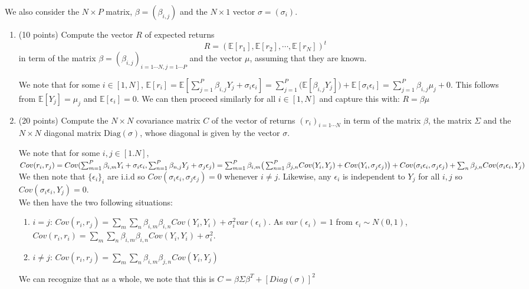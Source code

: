 \documentclass[12pt,twoside, letter]{exam}
\theoremstyle{definition}
\newcommand{\ee}{\mathbb{E}}
\begin{document}
We also consider the  $N\times P$ matrix, $\beta=(\beta_{i,j})$ and the $N\times 1$ vector $\sigma=(\sigma_i)$.
\begin{enumerate}
	\item (10 points) Compute the vector $R$ of expected returns
	\[R=(\mathbb{E}[r_1],\mathbb{E}[r_2],\cdots,\mathbb{E}[r_N])^t\] in term of the matrix $\beta=(\beta_{i,j})_{i=1\cdots N,j=1\cdots P }$ and the vector $\mu$, assuming that they are known.
    \begin{solution}
      We note that for some $i \in [1,N]$, $\ee[r_{i}] = \ee[\sum_{j=1}^P \beta_{i,j}Y_j+ \sigma_{i}\epsilon_i] = \sum^{P}_{j = 1} \big(\ee[\beta_{i,j}Y_{j}]\big) + \ee[\sigma_{i}\epsilon_{i}]
      = \sum_{j=1}^P \beta_{i,j} \mu_{j} + 0$. This follows from $\ee[Y_{j}] = \mu_{j}$ and $\ee[\epsilon_{i}] = 0$.
      We can then proceed similarly for all $i \in [1,N]$ and capture this with: $R = \beta \mu$
    \end{solution}
  \item (20 points) Compute the $N\times N$ covariance matrix $C$ of the vector of returns $(r_i)_{i=1\cdots N}$ in term of the matrix $\beta$, the matrix $\Sigma$ and the $N\times N$ diagonal matrix $\text{Diag}(\sigma)$, whose diagonal is given by the vector $\sigma$.
    \begin{solution}
      We note that for some $i,j \in [1.N]$, $Cov(r_{i}, r_{j}) \\
      = Cov(\sum_{m=1}^P \beta_{i,m}Y_i + \sigma_{i}\epsilon_{i}, \sum_{n=1}^P \beta_{n,j}Y_j + \sigma_{j}\epsilon_{j}) \\
      = \sum_{m=1}^{P} \beta_{i,m} \big( \sum_{n=1}^P \beta_{j,n} Cov(Y_{i}, Y_{j}) + Cov(Y_{i}, \sigma_{j}\epsilon_{j}) \big)
      + Cov(\sigma_{i}\epsilon_{i}, \sigma_{j}\epsilon_{j}) + \sum_{n} \beta_{j,n} Cov(\sigma_{i}\epsilon_{i}, Y_{j})$ \\
      We then note that $\{\epsilon_{i}\}_{i}$ are i.i.d so $Cov(\sigma_{i}\epsilon_{i}, \sigma_{j}\epsilon_{j}) = 0$ whenever $i \neq j$. Likewise,
      any $\epsilon_{i}$ is independent to $Y_{j}$ for all $i,j$ so $Cov(\sigma_{i}\epsilon_{i}, Y_{j}) = 0$. \\
      We then have the two following situations:
      \begin{enumerate}
        \item $i = j$: $Cov(r_{i}, r_{j}) = \sum_{m}\sum_{n} \beta_{i,m} \beta_{i,n} Cov(Y_{i}, Y_{i}) + \sigma_{i}^{2} var(\epsilon_{i})$. As $var(\epsilon_{i}) = 1$ from $\epsilon_{i} \sim N(0,1)$,
        $Cov(r_{i}, r_{i}) = \sum_{m}\sum_{n} \beta_{i,m} \beta_{i,n} Cov(Y_{i}, Y_{i}) + \sigma_{i}^{2}$.
        \item $i \neq j$: $Cov(r_{i}, r_{j}) = \sum_{m}\sum_{n} \beta_{i,m} \beta_{j,n} Cov(Y_{i}, Y_{j})$
      \end{enumerate}
      We can recognize that as a whole, we note that this is $C = \beta \Sigma \beta^{T} + [Diag(\sigma)]^2$
    \end{solution}
\end{enumerate}
\bigskip
\end{document}

